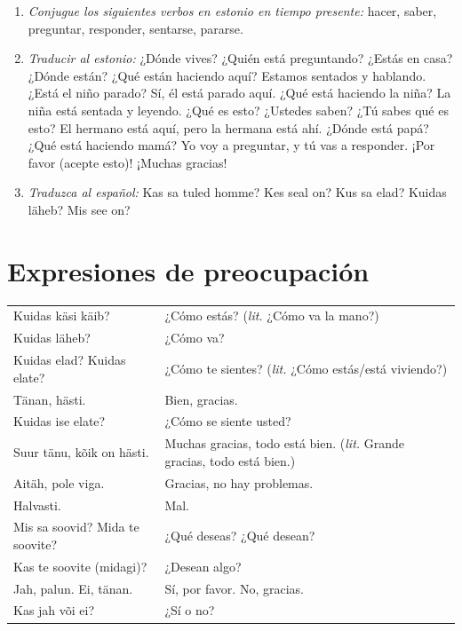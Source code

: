 \begin{enumerate}
	\item \emph{Conjugue los siguientes verbos en estonio en tiempo presente:} hacer, saber, preguntar, responder, sentarse, pararse.
	\item \emph{Traducir al estonio:} ¿Dónde vives? ¿Quién está preguntando? ¿Estás en casa? ¿Dónde están? ¿Qué están haciendo aquí? Estamos sentados y hablando. ¿Está el niño parado? Sí, él está parado aquí. ¿Qué está haciendo la niña? La niña está sentada y leyendo. ¿Qué es esto? ¿Ustedes saben? ¿Tú sabes qué es esto? El hermano está aquí, pero la hermana está ahí. ¿Dónde está papá? ¿Qué está haciendo mamá? Yo voy a preguntar, y tú vas a responder. ¡Por favor (acepte esto)! ¡Muchas gracias!
	\item \emph{Traduzca al español:} Kas sa tuled homme? Kes seal on? Kus sa elad? Kuidas läheb? Mis see on? 
\end{enumerate}

\Large{\section*{Expresiones de preocupación}}

\begin{tabular}{ l p{6.5cm} }
	Kuidas käsi käib?				& ¿Cómo estás? (\emph{lit.} ¿Cómo va la mano?) \\
	Kuidas läheb?					& ¿Cómo va? \\
	Kuidas elad? Kuidas elate?		& ¿Cómo te sientes? (\emph{lit.} ¿Cómo estás/está viviendo?) \\
	Tänan, hästi.					& Bien, gracias. \\
	Kuidas ise elate?				& ¿Cómo se siente usted? \\
	Suur tänu, kõik on hästi.		& Muchas gracias, todo está bien. (\emph{lit.} Grande gracias, todo está bien.) \\
	Aitäh, pole viga.				& Gracias, no hay problemas. \\
	Halvasti.						& Mal. \\
	Mis sa soovid? Mida te soovite? & ¿Qué deseas? ¿Qué desean? \\
	Kas te soovite (midagi)?		& ¿Desean algo? \\
	Jah, palun. Ei, tänan.			& Sí, por favor. No, gracias. \\
	Kas jah või ei?					& ¿Sí o no?
\end{tabular}

